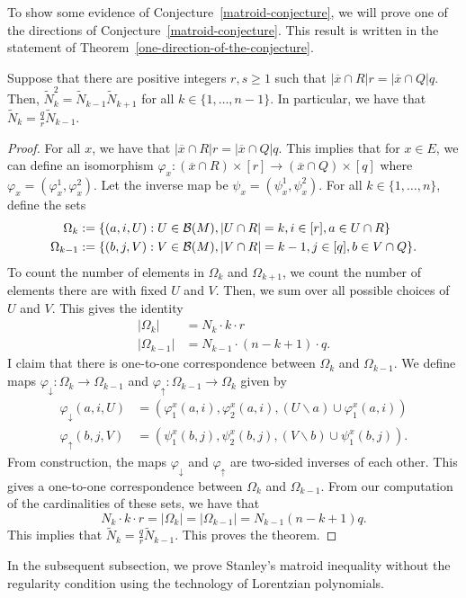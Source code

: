 \documentclass{puthesis-UG}
\begin{document}
To show some evidence of Conjecture~\ref{matroid-conjecture}, we will prove one of the directions of Conjecture~\ref{matroid-conjecture}. This result is written in the statement of Theorem~\ref{one-direction-of-the-conjecture}.

\begin{thm} \label{one-direction-of-the-conjecture}
	Suppose that there are positive integers $r, s \geq 1$ such that $| \overline{x} \cap R| r = |\overline{x} \cap Q| q$. Then, $\widetilde{N}_k^2 = \widetilde{N}_{k-1} \widetilde{N}_{k+1}$ for all $k \in \{1, \ldots, n-1\}$. In particular, we have that $\widetilde{N}_k = \frac{q}{r} \widetilde{N}_{k-1}$. 
\end{thm}

\begin{proof}
	For all $x$, we have that $| \overline{x} \cap R| r = |\overline{x} \cap Q| q$. This implies that for $x \in E$, we can define an isomorphism $\varphi_x : (\overline{x} \cap R) \times [r] \to (\overline{x} \cap Q) \times [q]$ where $\varphi_x = \left(\varphi_x^1, \varphi_x^2\right)$. Let the inverse map be $\psi_x = (\psi_x^1, \psi_x^2)$. For all $k \in \{1, \ldots, n\}$, define the sets
	\begin{align*}
		\Omega_k & := \{(a, i, U) : U \in \mathcal{B}(M), |U \cap R| = k, i \in [r], a \in U \cap R\} \\
		\Omega_{k-1} & := \{(b, j, V) : V \in \mathcal{B}(M), |V \cap R| = k-1, j \in [q], b \in V \cap Q\}.
	\end{align*}
	To count the number of elements in $\Omega_k$ and $\Omega_{k+1}$, we count the number of elements there are with fixed $U$ and $V$. Then, we sum over all possible choices of $U$ and $V$. This gives the identity
	\begin{align*}
		|\Omega_k| & = N_k \cdot k \cdot r \\
		|\Omega_{k-1}| & = N_{k-1} \cdot (n-k+1) \cdot q.
	\end{align*}
	I claim that there is one-to-one correspondence between $\Omega_k$ and $\Omega_{k-1}$. We define maps $\varphi_{\downarrow} : \Omega_k \to \Omega_{k-1}$ and $\varphi_{\uparrow} : \Omega_{k-1} \to \Omega_k$ given by 
	\begin{align*}
		\varphi_{\downarrow}(a, i, U) & = (\varphi_1^x(a, i), \varphi_2^x (a, i) , (U \backslash a) \cup \varphi_1^x (a, i)) \\
		\varphi_{\uparrow} (b, j, V) & = (\psi_1^x(b, j), \psi_2^x(b,j), (V \backslash b) \cup \psi_1^x(b, j)).
	\end{align*}
	From construction, the maps $\varphi_{\downarrow}$ and $\varphi_{\uparrow}$ are two-sided inverses of each other. This gives a one-to-one correspondence between $\Omega_k$ and $\Omega_{k-1}$. From our computation of the cardinalities of these sets, we have that 
	\[
		N_k \cdot k \cdot r = |\Omega_k| = |\Omega_{k-1}| = N_{k-1} (n-k+1) q.
	\]
	This implies that $\widetilde{N}_k = \frac{q}{r} \widetilde{N}_{k-1}$. This proves the theorem. 
\end{proof}
In the subsequent subsection, we prove Stanley's matroid inequality without the regularity condition using the technology of Lorentzian polynomials. 
\end{document}
